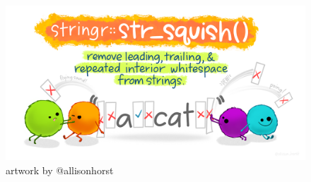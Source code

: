 \documentclass[
  letterpaper,
  DIV=11,
  numbers=noendperiod]{scrartcl}
\begin{document}
\begin{figure}

{\centering \includegraphics{118_Q_stringr_files/mediabag/0e4df3af-8bca-4f5e-9.png}

}

\caption{artwork by @allisonhorst}

\end{figure}
\end{document}
